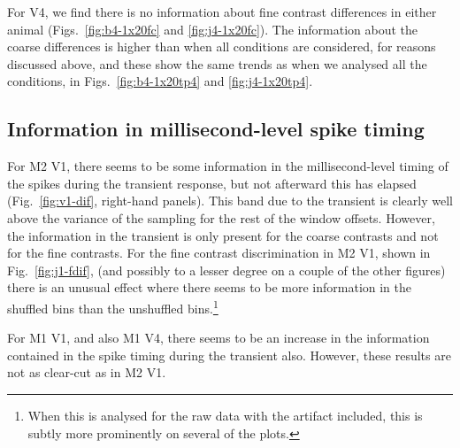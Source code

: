 For \ac{V4}, we find there is no information about fine contrast differences in either animal (Figs.~\ref{fig:b4-1x20fc} and \ref{fig:j4-1x20fc}). The information about the coarse differences is higher than when all conditions are considered, for reasons discussed above, and these show the same trends as when we analysed all the conditions, in Figs.~\ref{fig:b4-1x20tp4} and \ref{fig:j4-1x20tp4}.

\FloatBarrier
\subsection{Information in millisecond-level spike timing}

For \ac{M2} \ac{V1}, there seems to be some information in the millisecond-level timing of the spikes during the transient response, but not afterward this has elapsed (Fig.~\ref{fig:v1-dif}, right-hand panels). This band due to the transient is clearly well above the variance of the sampling for the rest of the window offsets.
However, the information in the transient is only present for the coarse contrasts and not for the fine contrasts.
For the fine contrast discrimination in \ac{M2} \ac{V1}, shown in Fig.~\ref{fig:j1-fdif}, (and possibly to a lesser degree on a couple of the other figures) there is an unusual effect where there seems to be more information in the shuffled bins than the unshuffled bins.\footnote{When this is analysed for the raw data with the artifact included, this is subtly more prominently on several of the plots.}

For \ac{M1} \ac{V1}, and also \ac{M1} \ac{V4}, there seems to be an increase in the information contained in the spike timing during the transient also. However, these results are not as clear-cut as in \ac{M2} \ac{V1}.

% 

